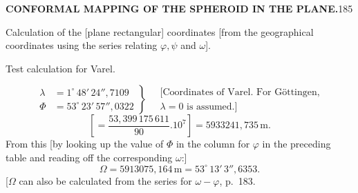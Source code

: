 \par\clearpage
\noindent\null\hfill{\small\textbf{CONFORMAL MAPPING OF THE SPHEROID IN THE PLANE.}}\hfill185\par\medskip
{\centering [29.]\par\medskip
Calculation of the [plane rectangular] coordinates [from the geographical\\
coordinates using the series relating \(\varphi,\psi\) and \(\omega\)].\par\smallskip
Test calculation for Varel.\par}
\[
\left.\begin{aligned}
\lambda&=1^\circ\,48'\,24''{,}7109\\
\Phi&=53^\circ\,23'\,57''{,}0322
\end{aligned}\right\}\quad
\begin{gathered}
\text{[Coordinates of Varel. For Göttingen,}\\
\lambda=0\text{ is assumed.]}
\end{gathered}
\]
\[
\left[=\frac{53{,}399\,175\,611}{90}.10^7\right]=5933241{,}735\,\mathrm{m}.
\]
From this [by looking up the value of \(\Phi\) in the column for \(\varphi\) in the preceding table and reading off the corresponding \(\omega\):]
\[
\Omega=5913075{,}164\,\mathrm{m}=53^\circ\,13'\,3''{,}6353.
\]
[\(\Omega\) can also be calculated from the series for \(\omega-\varphi\), p.~183.

